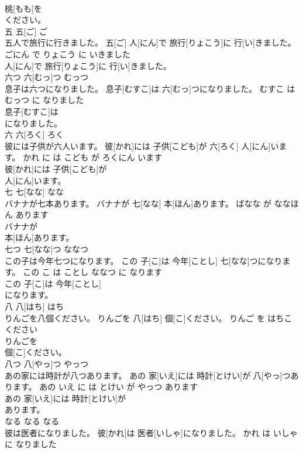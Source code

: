 \documentclass[8pt]{extreport}
\begin{document}
\begin{CJK}{UTF8}{min}
\\	桃[もも]を
\\	ください。			
\\	五	五[ご]	ご	
\\	五人で旅行に行きました。	五[ご] 人[にん]で 旅行[りょこう]に 行[い]きました。	ごにん で りょこう に いきました	
\\	人[にん]で 旅行[りょこう]に 行[い]きました。			
\\	六つ	六[むっ]つ	むっつ	
\\	息子は六つになりました。	息子[むすこ]は 六[むっ]つになりました。	むすこ は むっつ に なりました	
\\	息子[むすこ]は
\\	になりました。			
\\	六	六[ろく]	ろく	
\\	彼には子供が六人います。	彼[かれ]には 子供[こども]が 六[ろく] 人[にん]います。	かれ に は こども が ろくにん います	
\\	彼[かれ]には 子供[こども]が
\\	人[にん]います。			
\\	七	七[なな]	なな	
\\	バナナが七本あります。	バナナが 七[なな] 本[ほん]あります。	ばなな が ななほん あります	
\\	バナナが
\\	本[ほん]あります。			
\\	七つ	七[なな]つ	ななつ	
\\	この子は今年七つになります。	この 子[こ]は 今年[ことし] 七[なな]つになります。	この こ は ことし ななつ に なります	
\\	この 子[こ]は 今年[ことし]
\\	になります。			
\\	八	八[はち]	はち	
\\	りんごを八個ください。	りんごを 八[はち] 個[こ]ください。	りんご を はちこ ください	
\\	りんごを
\\	個[こ]ください。			
\\	八つ	八[やっ]つ	やっつ	
\\	あの家には時計が八つあります。	あの 家[いえ]には 時計[とけい]が 八[やっ]つあります。	あの いえ に は とけい が やっつ あります	
\\	あの 家[いえ]には 時計[とけい]が
\\	あります。			
\\	なる	なる	なる	
\\	彼は医者になりました。	彼[かれ]は 医者[いしゃ]になりました。	かれ は いしゃ に なりました	

\end{CJK}
\end{document}
